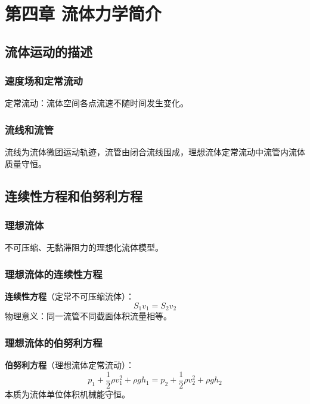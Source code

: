 \chapter{第四章 流体力学简介}

\section{流体运动的描述}
    \subsection{速度场和定常流动}
    定常流动：流体空间各点流速不随时间发生变化。
    \subsection{流线和流管}
    流线为流体微团运动轨迹，流管由闭合流线围成，理想流体定常流动中流管内流体质量守恒。

\section{连续性方程和伯努利方程}
    \subsection{理想流体}
    不可压缩、无黏滞阻力的理想化流体模型。
    \subsection{理想流体的连续性方程}
    \textbf{连续性方程}（定常不可压缩流体）：
    \[
    S_1 v_1 = S_2 v_2
    \]
    物理意义：同一流管不同截面体积流量相等。
    \subsection{理想流体的伯努利方程}
    \textbf{伯努利方程}（理想流体定常流动）：
    \[
    p_1+\frac{1}{2}\rho v_1^2+\rho g h_1 = p_2+\frac{1}{2}\rho v_2^2+\rho g h_2
    \]
    本质为流体单位体积机械能守恒。